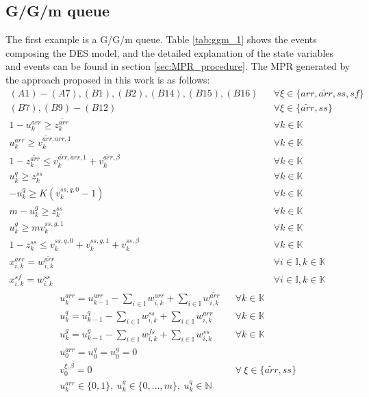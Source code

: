\documentclass[]{interact}
\theoremstyle{plain}%
\theoremstyle{definition}
\theoremstyle{remark}
\begin{document}
\subsection{G/G/m queue}\label{sec:ggm}
The first example is a G/G/m queue. Table \ref{tab:ggm_1} shows the events composing the DES model, and the detailed explanation of the state variables and events can be found in section \ref{sec:MPR_procedure}. The MPR generated by the approach proposed in this work is as follows: 
\begin{eqnarray}
(A1)-(A7),(B1),(B2),(B14),(B15),(B16)&& \forall \xi \in\{arr,\tilde{arr},ss,sf\}\nonumber\\
(B7),(B9)-(B12)&& \forall \xi \in\{\tilde{arr},ss\}\nonumber\\
1-u^{arr}_{k} \ge z^{\tilde{arr}}_{k} &&\forall k\in \mathbb{K} \label{GG1:a1}\\
u^{arr}_{k} \ge v^{\tilde{arr},arr,1}_k &&\forall k\in \mathbb{K} \label{GG1:a2}\\
1-z^{\tilde{arr}}_{k}\le  v^{\tilde{arr},arr,1}_k +v^{\tilde{arr},\beta}_k&&\forall k\in \mathbb{K}\label{GG1:a3}\\
u^q_k \ge z^{ss}_{k}&&\forall k\in \mathbb{K} \label{GG1:s1}\\
- u^q_k \ge K(v^{ss,q,0}_k-1)&&\forall k\in \mathbb{K} \label{GG1:s2}\\
m-u^g_k \ge z^{ss}_{k}&&\forall k\in \mathbb{K} \label{GG1:s3}\\
u^g_k  \ge mv^{ss,g,1}_k&&\forall k\in \mathbb{K} \label{GG1:s4}\\
1-z^{ss}_{k}\le  v^{ss,q,0}_k+v^{ss,g,1}_k +v^{ss,\beta}_k&&\forall k\in \mathbb{K}\label{GG1:s5}\\
x^{arr}_{i,k} = w^{\tilde{arr}}_{i,k} && \forall i\in \mathbb{I},k\in \mathbb{K} \label{GG1:a6}\\
x^{sf}_{i,k} = w^{ss}_{i,k} && \forall i\in \mathbb{I},k\in \mathbb{K} \label{GG1:f1}
\end{eqnarray}
\begin{eqnarray}
u^{arr}_k = u^{arr}_{k-1} - \sum_{i\in\mathbb{I}}w^{arr}_{i,k} +\sum_{i\in\mathbb{I}} w^{\tilde{arr}}_{i,k}&&\forall k \in \mathbb{K} \label{GG1:E_arr}\\
u^{q}_k = u^{q}_{k-1} - \sum_{i\in\mathbb{I}}w^{ss}_{i,k} + \sum_{i\in\mathbb{I}}w^{arr}_{i,k}&&\forall k \in \mathbb{K}\label{GG1:E_q}\\
u^{g}_k = u^{g}_{k-1} - \sum_{i\in\mathbb{I}}w^{fs}_{i,k} + \sum_{i\in\mathbb{I}}w^{ss}_{i,k}&&\forall k \in \mathbb{K}\label{GG1:E_g}\\
u^{arr}_0=u^q_0=u^g_0=0\nonumber\\
v^{\xi,\beta}_0=0&&\forall\ \xi\in \{\tilde{arr},ss\}\nonumber\\
u^{arr}_{k}\in\{0,1\},\ u^g_{k}\in\{0,...,m\},\ u^{q}_k\in \mathbb{N}\nonumber
\end{eqnarray}
\end{document}
